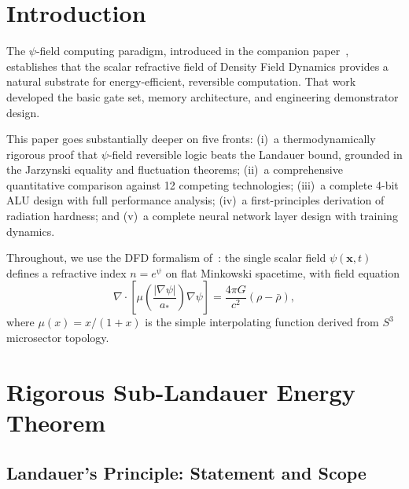 \documentclass[11pt,twocolumn]{article}
\theoremstyle{definition}
\theoremstyle{remark}
\newcommand{\astar}{a_*}
\begin{document}
\section{Introduction}\label{sec:intro}

The $\psi$-field computing paradigm, introduced in the companion
paper~\cite{Alcock2025psiComputing}, establishes that the scalar
refractive field of Density Field Dynamics provides a natural substrate
for energy-efficient, reversible computation. That work developed the
basic gate set, memory architecture, and engineering demonstrator design.

This paper goes substantially deeper on five fronts: (i)~a
thermodynamically rigorous proof that $\psi$-field reversible logic
beats the Landauer bound, grounded in the Jarzynski equality and
fluctuation theorems; (ii)~a comprehensive quantitative comparison
against 12 competing technologies; (iii)~a complete 4-bit ALU design
with full performance analysis; (iv)~a first-principles derivation of
radiation hardness; and (v)~a complete neural network layer design with
training dynamics.

Throughout, we use the DFD formalism of~\cite{Alcock2025DFD}: the
single scalar field $\psi(\mathbf{x},t)$ defines a refractive index
$n = e^\psi$ on flat Minkowski spacetime, with field equation
\begin{equation}
\nabla\cdot\!\left[\mu\!\left(\frac{|\nabla\psi|}{\astar}\right)
\nabla\psi\right] = \frac{4\pi G}{c^2}(\rho - \bar\rho),
\label{eq:field_eq}
\end{equation}
where $\mu(x) = x/(1+x)$ is the simple interpolating function derived
from $S^3$ microsector topology.

\section{Rigorous Sub-Landauer Energy Theorem}\label{sec:landauer}

\subsection{Landauer's Principle: Statement and Scope}\label{sec:landauer_statement}
\end{document}
